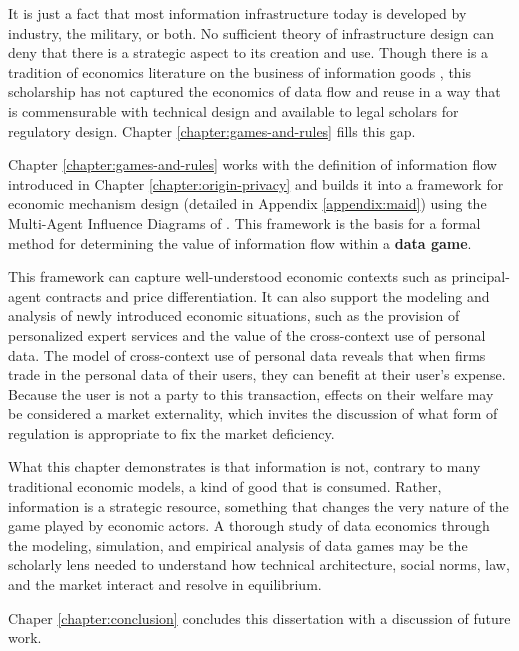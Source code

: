 \documentclass[../thesis.tex]{subfiles}
\begin{document}
 It is just a fact that most information infrastructure
 today is developed by industry, the military, or both.
 No sufficient theory of infrastructure design can
 deny that there is a strategic aspect to its
 creation and use.
 Though there is a tradition of economics literature
 on the business of information goods
\cite{shapiro1998information}
\cite{varian2001economics} \cite{acquisti2016economics},
this scholarship has not captured the economics of data flow
and reuse
in a way that is commensurable with technical design and
available to legal scholars for regulatory design.
Chapter \ref{chapter:games-and-rules} fills this gap.

 Chapter \ref{chapter:games-and-rules} works with the
 definition of information flow introduced in
 Chapter \ref{chapter:origin-privacy} and builds
 it into a framework for economic mechanism design
 (detailed in Appendix \ref{appendix:maid})
 using the Multi-Agent Influence Diagrams
 of \citet{koller2003multi}.
 This framework is the basis for a formal method for
 determining the value of information flow within a
 \textbf{data game}.

 This framework can capture well-understood economic
 contexts such as principal-agent contracts and
 price differentiation.
 It can also support the modeling and analysis of
 newly introduced economic situations, such as the provision
 of personalized expert services and the
 value of the cross-context use of personal data.
 The model of cross-context use of personal data
 reveals that when firms trade in the personal data
 of their users, they can benefit at their user's expense.
 Because the user is not a party to this transaction,
 effects on their welfare may be considered a market externality,
 which invites the discussion of what form of
 regulation is appropriate to fix the market deficiency.

 What this chapter demonstrates is that information
 is not, contrary to many traditional economic models,
 a kind of good that is consumed.
 Rather, information is a strategic resource, something
 that changes the very nature of the game played by
 economic actors.
 A thorough study of data economics through the
 modeling, simulation, and empirical analysis of
 data games may be the scholarly lens needed to
 understand how technical architecture, social norms,
 law, and the market interact and resolve in equilibrium.

 Chaper \ref{chapter:conclusion} concludes this dissertation
 with a discussion of future work.
 
\end{document}

